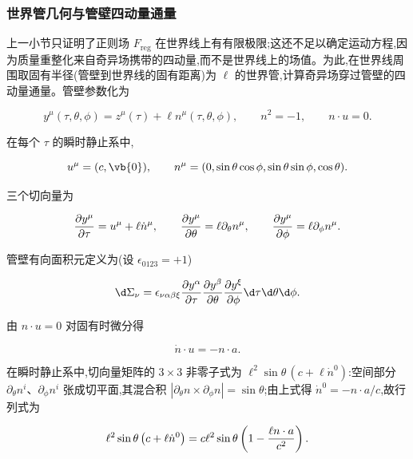 \subsubsection{世界管几何与管壁四动量通量}

上一小节只证明了正则场 $F_{\mathrm{reg}}$ 在世界线上有有限极限;这还不足以确定运动方程,因为质量重整化来自奇异场携带的四动量,而不是世界线上的场值。为此,在世界线周围取固有半径(管壁到世界线的固有距离)为 $\ell$ 的世界管,计算奇异场穿过管壁的四动量通量。管壁参数化为

\begin{equation*}
 y^\mu(\tau,\theta,\phi)
 =z^\mu(\tau)+\ell n^\mu(\tau,\theta,\phi),
 \qquad
 n^2=-1,
 \qquad
 n\cdot u=0.
\end{equation*}

在每个 $\tau$ 的瞬时静止系中,

\begin{equation*}
 u^\mu=(c,\vb{0}),
 \qquad
 n^\mu=(0,\sin\theta\cos\phi,\sin\theta\sin\phi,\cos\theta).
\end{equation*}

三个切向量为

\begin{equation*}
 {\partial y^\mu\over\partial\tau}=u^\mu+\ell\dot n^\mu,
 \qquad
 {\partial y^\mu\over\partial\theta}=\ell\partial_\theta n^\mu,
 \qquad
 {\partial y^\mu\over\partial\phi}=\ell\partial_\phi n^\mu.
\end{equation*}

管壁有向面积元定义为(设 $\epsilon_{0123}=+1$)

\begin{equation*}
 \d\Sigma_\nu
 =\epsilon_{\nu\alpha\beta\xi}
 {\partial y^\alpha\over\partial\tau}
 {\partial y^\beta\over\partial\theta}
 {\partial y^\xi\over\partial\phi}
 \d\tau\d\theta\d\phi.
\end{equation*}

由 $n\cdot u=0$ 对固有时微分得

\begin{equation*}
 \dot n\cdot u=-n\cdot a.
\end{equation*}

在瞬时静止系中,切向量矩阵的 $3\times3$ 非零子式为 $\ell^2\sin\theta\,(c+\ell\dot n^0)$:空间部分 $\partial_\theta n^i$、$\partial_\phi n^i$ 张成切平面,其混合积 $|\partial_\theta n\times\partial_\phi n|=\sin\theta$;由上式得 $\dot n^0=-n\cdot a/c$,故行列式为

\begin{equation*}
 \ell^2\sin\theta\left(c+\ell\dot n^0\right)
 =c\ell^2\sin\theta\left(1-{\ell n\cdot a\over c^2}\right).
\end{equation*}

